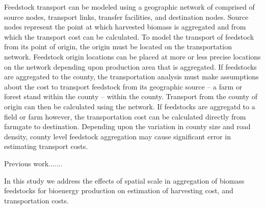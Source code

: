 \documentclass[review,3p,authoryear,times]{elsarticle}
\begin{document}
Feedstock transport can be modeled using a geographic network of comprised of source nodes, transport links, transfer facilities, and destination nodes. Source nodes represent the point at which harvested biomass is aggregated and from which the transport cost can be calculated. To model the transport of feedstock from its point of origin, the origin must be located on the transportation network. Feedstock origin locations can be placed at more or less precise locations on the network depending upon production area that is aggregated. If feedstocks are aggregated to the county, the transportation analysis must make assumptions about the cost to transport feedstock from its geographic source -- a farm or forest stand within the county -- within the county. Transport from the county of origin can then be calculated using the network. If feedstocks are aggregatd to a field or farm however, the transportation cost can be calculated directly from farmgate to destination. Depending upon the variation in county size and road density, county level feedstock aggregation may cause significant error in estimating transport costs. 

Previous work.......

In this study we address the effects of spatial scale in aggregation of biomass feedstocks for bioenergy production on estimation of harvesting cost, and transportation costs. 
\end{document}
